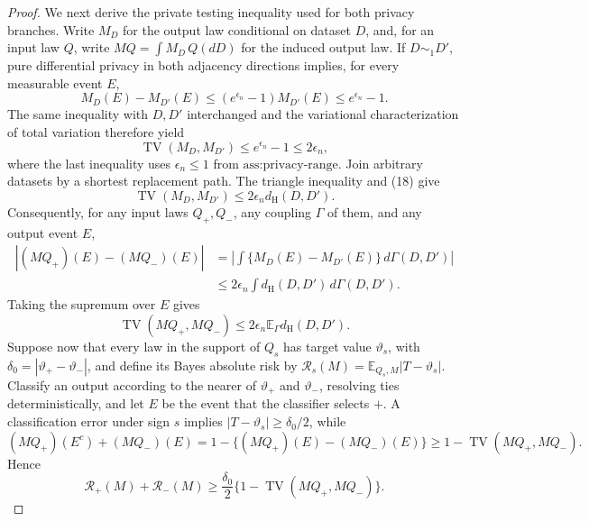 \documentclass{article}
\begin{document}
\begin{proof}
We next derive the private testing inequality used for both privacy branches.  Write \(M_D\) for the output law conditional on dataset \(D\), and, for an input law \(Q\), write \(MQ=\int M_D\,Q(dD)\) for the induced output law.  If \(D\sim_1D'\), pure differential privacy in both adjacency directions implies, for every measurable event \(E\),
\[
 M_D(E)-M_{D'}(E)\le (e^{\epsilon_n}-1)M_{D'}(E)\le e^{\epsilon_n}-1.
\]
The same inequality with \(D,D'\) interchanged and the variational characterization of total variation therefore yield
\[
 \operatorname{TV}(M_D,M_{D'})\le e^{\epsilon_n}-1\le2\epsilon_n,             \tag{18}
\]
where the last inequality uses \(\epsilon_n\le1\) from \(\text{ass:privacy-range}\).  Join arbitrary datasets by a shortest replacement path.  The triangle inequality and (18) give
\[
 \operatorname{TV}(M_D,M_{D'})\le2\epsilon_n d_{\mathrm H}(D,D').
\]
Consequently, for any input laws \(Q_+,Q_-\), any coupling \(\Gamma\) of them, and any output event \(E\),
\[
\begin{aligned}
 \left|(MQ_+)(E)-(MQ_-)(E)\right|
 &=\left|\int\{M_D(E)-M_{D'}(E)\}\,d\Gamma(D,D')\right|\\
 &\le2\epsilon_n\int d_{\mathrm H}(D,D')\,d\Gamma(D,D').
\end{aligned}
\]
Taking the supremum over \(E\) gives
\[
 \operatorname{TV}(MQ_+,MQ_-)
 \le2\epsilon_n\mathbb E_\Gamma d_{\mathrm H}(D,D').                         \tag{19}
\]
Suppose now that every law in the support of \(Q_s\) has target value \(\vartheta_s\), with \(\delta_0=|\vartheta_+-\vartheta_-|\), and define its Bayes absolute risk by \(\mathcal R_s(M)=\mathbb E_{Q_s,M}|T-\vartheta_s|\).  Classify an output according to the nearer of \(\vartheta_+\) and \(\vartheta_-\), resolving ties deterministically, and let \(E\) be the event that the classifier selects \(+\).  A classification error under sign \(s\) implies \(|T-\vartheta_s|\ge\delta_0/2\), while
\[
 (MQ_+)(E^c)+(MQ_-)(E)
 =1-\{(MQ_+)(E)-(MQ_-)(E)\}
 \ge1-\operatorname{TV}(MQ_+,MQ_-).
\]
Hence
\[
 \mathcal R_+(M)+\mathcal R_-(M)
 \ge \frac{\delta_0}{2}
       \{1-\operatorname{TV}(MQ_+,MQ_-)\}.                                  \tag{20}
\]


\end{proof}
\end{document}
